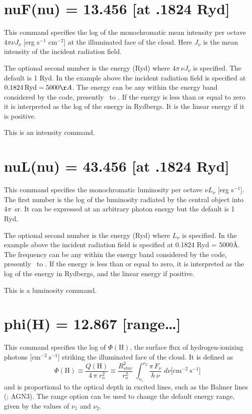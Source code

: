 \section{nuF(nu) = 13.456 [at .1824 Ryd]}

This command specifies the log of the monochromatic mean intensity
per octave $4\pi \nu J_\nu  $ [erg s$^{-1}$ cm$^{-2}$]
at the illuminated face of the cloud.
Here $J_{\nu}$ is the
mean intensity of the incident radiation field.

The optional second number is the energy (Ryd) where
$4\pi \,\nu J_\nu  $ is specified.
The default is 1 Ryd.  In the example above the incident radiation field
is specified at $0.1824 \Ryd = 5000\AA$.
The energy can be any within the
energy band considered by the code,
presently \emm\ to \egamry .
If the energy is less than or equal to zero it is interpreted as the
log of the energy in Rydbergs.  It is the linear energy if it is positive.

This is an intensity command.

\section{nuL(nu) = 43.456 [at .1824 Ryd]}

This command specifies the monochromatic luminosity per octave
$\nu L_\nu$ [erg s$^{-1}$].
The first number is the log of the luminosity radiated by the central
object into $4\pi$~sr.  It can be expressed at an arbitrary photon
energy but the default is 1 Ryd.

The optional second number is the energy (Ryd) where $L_\nu$ is
specified.
In the example above the incident radiation field is specified
at 0.1824 Ryd = 5000\AA.
The frequency can be any within the energy band considered by
the code, presently \emm\ to \egamry .  If the energy is less
than or equal to zero, it is interpreted as the log of the energy in
Rydbergs, and the linear energy if positive.

This is a luminosity command.

\section{phi(H) = 12.867 [range\dots]}

This command specifies the log of $\Phi(\mathrm{H})$,
the surface flux of
hydrogen-ionizing photons [cm$^{-2}\ \mathrm{s}^{-1}$]
striking the illuminated face of the cloud.
It is defined as
\begin{equation}
\Phi \left( {\mathrm{H}} \right) \equiv \frac{{Q\left( {\mathrm{H}} \right)}}{{4\,\pi
\;r_{\mathrm{o}}^{\mathrm{2}} }} \equiv \frac{{R_{star}^2 }}{{r_{\mathrm{o}}^2
}}\;\int_{\nu _1 }^{\nu _2 } {\frac{{\pi \,F_\nu  }}{{h\,\nu }}\;d\nu }
 [\mathrm{cm}^{-2}\ \mathrm{s}{^{-1}]}
\end{equation}
and is proportional to the optical depth in excited lines,
such as the Balmer lines (\citealp{FerlandNetzerShields1979}; AGN3).
The range option can be
used to change the default energy range,
given by the values of $\nu_{1}$ and $\nu_{2}$.

